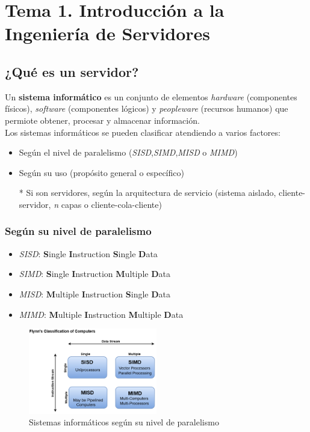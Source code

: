 \documentclass[12pt,spanish]{article}
\begin{document}
\section{Tema 1. Introducción a la Ingeniería de Servidores}

\subsection{¿Qué es un servidor?}

Un \textbf{sistema informático} es un conjunto de elementos \textit{hardware} (componentes físicos), \textit{software} (componentes lógicos) y \textit{peopleware} (recursos humanos) que permiote obtener, procesar y almacenar información.\\
Los sistemas informáticos se pueden clasificar atendiendo a varios factores:
\begin{itemize}
	\item Según el nivel de paralelismo (\textit{SISD},\textit{SIMD},\textit{MISD} o \textit{MIMD})
	\item Según su uso (propósito general o específico)
	\item[*] Si son servidores, según la arquitectura de servicio (sistema aislado, cliente-servidor, \emph{n} capas o cliente-cola-cliente)
\end{itemize}

\subsubsection{Según su nivel de paralelismo}

\begin{itemize}
	\item \textit{SISD}: \textbf{S}ingle \textbf{I}nstruction \textbf{S}ingle \textbf{D}ata
	\item \textit{SIMD}: \textbf{S}ingle \textbf{I}nstruction \textbf{M}ultiple \textbf{D}ata
	\item \textit{MISD}: \textbf{M}ultiple \textbf{I}nstruction  \textbf{S}ingle \textbf{D}ata
	\item \textit{MIMD}: \textbf{M}ultiple \textbf{I}nstruction  \textbf{M}ultiple \textbf{D}ata
\end{itemize}
\begin{figure}[H]
	\centering
	\includegraphics[width=0.5\textwidth]{comparacion_paralelismo.png}
	\caption{Sistemas informáticos según su nivel de paralelismo}
\end{figure}
\end{document}
